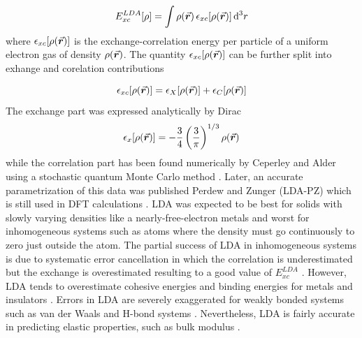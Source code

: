 \begin{equation} \label{eq:LDA-XC}
	E^{LDA}_{xc} [\rho]= \int \rho({\va*{r}}) \,\epsilon_{xc}[\rho({\va*{r}}) ] \dd[3]{r}
\end{equation}
where $\epsilon_{xc}[\rho({\va*{r}}) ]$ is the exchange-correlation energy per particle of a uniform electron gas of density $\rho({\va*{r}})$. The quantity $\epsilon_{xc}[\rho({\va*{r}}) ]$ can be further split into exhange and corelation contributions

\begin{equation}
	\epsilon_{xc}[\rho({\va*{r}}) ] = \epsilon_{X}[\rho({\va*{r}}) ] + \epsilon_{C}[\rho({\va*{r}})]
\end{equation}
The exchange part was expressed analytically by Dirac \citep{Dirac1930}
\begin{equation} \label{eq:Dirac-ex}
	\epsilon_{x}[\rho({\va*{r}}) ] = - \frac{3}{4} \left( \frac{3}{\pi} \right)^{1/3} \rho({\va*{r}})
\end{equation}
while the correlation part has been found  numerically by Ceperley and Alder \citep{Ceperley1980} using a stochastic quantum Monte Carlo method \citep{Foulkes2001}. Later, an accurate parametrization of this data was published Perdew and Zunger (LDA-PZ) which is still used in DFT calculations \citep{Perdew1981}. LDA was expected to be best for solids with slowly varying densities like  a nearly-free-electron metals and worst for inhomogeneous systems such as atoms where the density must go continuously to zero just outside the atom. The partial success of LDA in inhomogeneous systems is due to systematic error cancellation in which the correlation is underestimated  but the exchange is overestimated resulting to a good value of $E^{LDA}_{xc}$ \citep{Gunnarsson1976,Gunnarsson1977}. However, LDA tends to overestimate cohesive energies and binding energies for metals and insulators \citep{Staroverov2004,Csonka2009,Harl2010}. Errors in LDA are severely exaggerated for weakly bonded systems such as van der Waals and H-bond systems \citep{Lee1993,Hamann1997,Feibelman2008}. Nevertheless, LDA is fairly accurate in predicting elastic properties, such as bulk modulus \citep{Froyen1983,Tan2012}.

